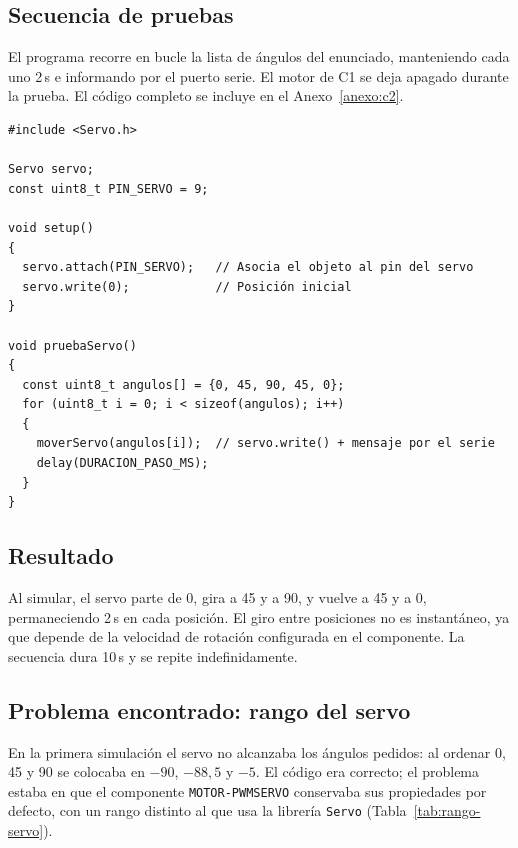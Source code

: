 \documentclass{upo-master}
\begin{document}
\subsection{Secuencia de pruebas}

El programa recorre en bucle la lista de ángulos del enunciado, manteniendo
cada uno 2\,s e informando por el puerto serie. El motor de C1 se deja apagado
durante la prueba. El código completo se incluye en el Anexo~\ref{anexo:c2}.

\begin{lstlisting}[style=arduino, caption={Configuración del servo y secuencia de prueba.}]
#include <Servo.h>

Servo servo;
const uint8_t PIN_SERVO = 9;

void setup()
{
  servo.attach(PIN_SERVO);   // Asocia el objeto al pin del servo
  servo.write(0);            // Posición inicial
}

void pruebaServo()
{
  const uint8_t angulos[] = {0, 45, 90, 45, 0};
  for (uint8_t i = 0; i < sizeof(angulos); i++)
  {
    moverServo(angulos[i]);  // servo.write() + mensaje por el serie
    delay(DURACION_PASO_MS);
  }
}
\end{lstlisting}

\subsection{Resultado}

Al simular, el servo parte de 0\textdegree, gira a 45\textdegree{} y a
90\textdegree, y vuelve a 45\textdegree{} y a 0\textdegree, permaneciendo 2\,s
en cada posición. El giro entre posiciones no es instantáneo, ya que depende
de la velocidad de rotación configurada en el componente. La secuencia dura
10\,s y se repite indefinidamente.

\subsection{Problema encontrado: rango del servo}

En la primera simulación el servo no alcanzaba los ángulos pedidos: al
ordenar 0\textdegree, 45\textdegree{} y 90\textdegree{} se colocaba en
$-90$\textdegree, $-88{,}5$\textdegree{} y $-5$\textdegree. El código era
correcto; el problema estaba en que el componente \texttt{MOTOR-PWMSERVO}
conservaba sus propiedades por defecto, con un rango distinto al que usa la
librería \texttt{Servo} (Tabla~\ref{tab:rango-servo}).
\end{document}
